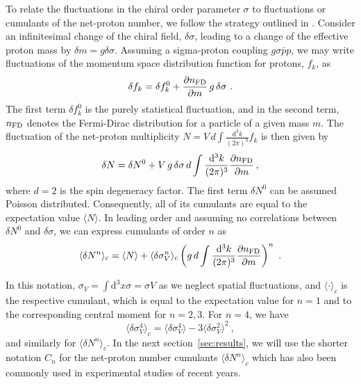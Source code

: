 \documentclass[%
 reprint,
 amsmath,amssymb,
 aps,
]{revtex4-2}
\begin{document}
To relate the fluctuations in the chiral order parameter $\sigma$ to fluctuations or cumulants of the net-proton number, we follow the strategy outlined in \cite{Stephanov:2011pb}. Consider an infinitesimal change of the chiral field, $\delta\sigma$, leading to a change of the effective proton mass by $\delta m = g \delta \sigma$. Assuming a sigma-proton coupling $g\sigma \bar p p$, we may write fluctuations of the momentum space distribution function for protons, $f_k$, as 
\begin{equation}
  \delta f_k = \delta f_k^0 + \frac{\partial n_{\rm FD}}{\partial m}\, g\,\delta\sigma~.
\end{equation}
The first term $\delta f_k^0$ is the purely statistical fluctuation, and in the second term, $n_{\rm FD}$ denotes the Fermi-Dirac distribution for a particle of a given mass $m$. The fluctuation of the net-proton multiplicity $N=V\,d\int \frac{\mathrm d^3 k}{(2\pi)^3} f_k$ is then given by  
\begin{equation}
  \delta N = \delta N^0 + V\, g\, \delta\sigma\,d
\int\frac{\mathrm d^3 k}{(2\pi)^3} \frac{\partial n_{\rm FD}}{\partial m}\,,
\end{equation}
where $d=2$ is the spin degeneracy factor. The first term $\delta N^0$ can be assumed Poisson distributed. Consequently, all of its cumulants are equal to the expectation value $\langle N\rangle$. In leading order and assuming no correlations between $\delta N^0$ and $\delta\sigma$, we can express cumulants of order $n$ as
\begin{equation}
  \label{eq:N4}
  \langle\delta N^n\rangle_c = \langle N\rangle + \langle \delta\sigma_V^n\rangle_c
\left( g\,d\int\frac{\mathrm d^3 k}{(2\pi)^3}\frac{\partial n_{\rm FD}}{\partial m}\right)^n~.
\end{equation}

In this notation, $\sigma_V=\int \mathrm d^3 x \sigma = \sigma V$ as we neglect spatial fluctuations, and $\langle \cdot \rangle_c$ is the respective cumulant, which is equal to the expectation value for $n=1$ and to the corresponding central moment for $n= 2, 3$. For $n=4$, we have 
\begin{equation}
    \langle \delta\sigma_V^4\rangle_c=\langle \delta\sigma_V^4\rangle - 3\langle\delta\sigma_V^2\rangle^2~,
\end{equation}
and similarly for $\langle\delta N^n\rangle_c$. In the next section~\ref{sec:results}, we will use the shorter notation $C_n$ for the net-proton number cumulants $\langle\delta N^n\rangle_c$ which has also been commonly used in experimental studies of recent years. 
\end{document}
